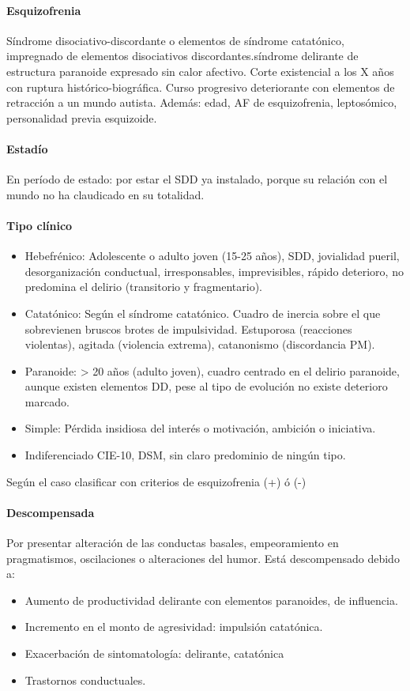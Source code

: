 \paragraph*{Esquizofrenia}
Síndrome disociativo-discordante o elementos de síndrome catatónico, impregnado de elementos disociativos discordantes.síndrome delirante de estructura paranoide expresado sin calor afectivo. Corte existencial a los X años con ruptura histórico-biográfica. Curso progresivo deteriorante con elementos de retracción a un mundo autista. Además: edad, AF de esquizofrenia, leptosómico, personalidad previa esquizoide.
\paragraph*{Estadío}
En período de estado: por estar el SDD ya instalado, porque su relación con el mundo no ha claudicado en su totalidad. 
\paragraph*{Tipo clínico}
\begin{itemize}
    \item Hebefrénico: Adolescente o adulto joven (15-25 años), SDD, jovialidad pueril, desorganización conductual, irresponsables, imprevisibles, rápido deterioro, no predomina el delirio (transitorio y fragmentario).
    \item Catatónico: Según el síndrome catatónico. Cuadro de inercia sobre el que sobrevienen bruscos brotes de impulsividad. Estuporosa (reacciones violentas), agitada (violencia extrema), catanonismo (discordancia PM).
    \item Paranoide: > 20 años (adulto joven), cuadro centrado en el delirio paranoide, aunque existen elementos DD, pese al tipo de evolución no existe deterioro marcado.
    \item Simple: Pérdida insidiosa del interés o motivación, ambición o iniciativa.
    \item Indiferenciado CIE-10, DSM, sin claro predominio de ningún tipo.
\end{itemize}
Según el caso clasificar con criterios de esquizofrenia (+) ó (-)
\paragraph*{Descompensada}
Por presentar alteración de las conductas basales, empeoramiento en pragmatismos, oscilaciones o alteraciones del humor. Está descompensado debido a:
\begin{itemize}
 \item Aumento de productividad delirante con elementos paranoides, de influencia.
 \item Incremento en el monto de agresividad: impulsión catatónica.
 \item Exacerbación de sintomatología: delirante, catatónica
 \item Trastornos conductuales.
\end{itemize}
